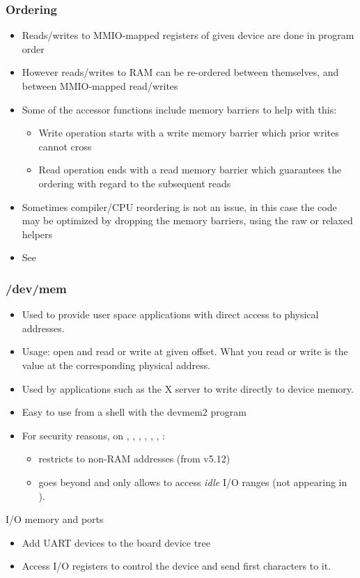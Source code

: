 \begin{frame}[fragile]
  \frametitle{Ordering}
  \begin{itemize}
  \item Reads/writes to MMIO-mapped registers of given device are done
    in program order
  \item However reads/writes to RAM can be re-ordered between
    themselves, and between MMIO-mapped read/writes
  \item Some of the accessor functions include memory barriers to help
    with this:
    \begin{itemize}
    \item Write operation starts with a write memory barrier which prior
      writes cannot cross
    \item Read operation ends with a read memory barrier which
      guarantees the ordering with regard to the subsequent reads
    \end{itemize}
  \item Sometimes compiler/CPU reordering is not an issue, in this case
    the code may be optimized by dropping the memory barriers, using the
    raw or relaxed helpers
  \item See 
  \end{itemize}
\end{frame}

\begin{frame}
  \frametitle{/dev/mem}
  \begin{itemize}
  \item Used to provide user space applications with direct access to
    physical addresses.
  \item Usage: open  and read or write at given offset.
    What you read or write is the value at the corresponding physical
    address.
  \item Used by applications such as the X server to write directly to
    device memory.
  \item Easy to use from a shell with the devmem2 program
  \item For security reasons, on , , ,
    , , , :
    \begin{itemize}
    \item {} restricts 
      to non-RAM addresses (from v5.12)
    \item {} goes beyond and only allows to
      access {\em idle} I/O ranges (not appearing in ).
    \end{itemize}
  \end{itemize}
\end{frame}

\setuplabframe
{I/O memory and ports}
{
\begin{itemize}
\item Add UART devices to the board device tree
\item Access I/O registers to control the device and
      send first characters to it.
\end{itemize}
}
